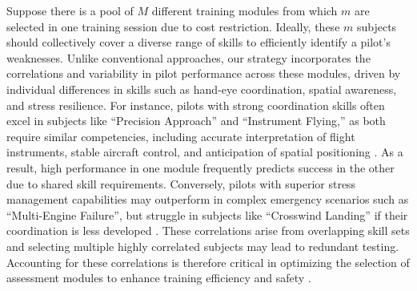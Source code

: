 \documentclass[opre,sglanonrev]{informs4}
\begin{document}
Suppose there is a pool of $M$ different training modules from which $m$ are selected in one training session due to cost restriction. Ideally, these $m$ subjects should collectively cover a diverse range of skills to efficiently identify a pilot’s weaknesses. Unlike conventional approaches, our strategy incorporates the correlations and variability in pilot performance across these modules, driven by individual differences in skills such as hand-eye coordination, spatial awareness, and stress resilience. For instance, pilots with strong coordination skills often excel in subjects like ``Precision Approach'' and ``Instrument Flying,'' as both require similar competencies, including accurate interpretation of flight instruments, stable aircraft control, and anticipation of spatial positioning \citep{Damos2003}. As a result, high performance in one module frequently predicts success in the other due to shared skill requirements. Conversely, pilots with superior stress management capabilities may outperform in complex emergency scenarios such as ``Multi-Engine Failure'', but struggle in subjects like ``Crosswind Landing'' if their coordination is less developed \citep{Szczepanska2025}. These correlations arise from overlapping skill sets and selecting multiple highly correlated subjects may lead to redundant testing. %
Accounting for these correlations is therefore critical in optimizing the selection of assessment modules to enhance training efficiency and safety \citep{Duruaku2024}. 
\end{document}
